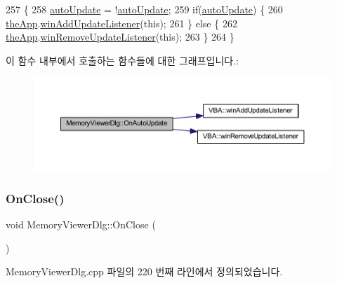 \begin{DoxyCode}
257 \{
258   \mbox{\hyperlink{class_memory_viewer_dlg_a3ec3d36d4676977f8f37f55ec7f7fb39}{autoUpdate}} = !\mbox{\hyperlink{class_memory_viewer_dlg_a3ec3d36d4676977f8f37f55ec7f7fb39}{autoUpdate}};
259   \textcolor{keywordflow}{if}(\mbox{\hyperlink{class_memory_viewer_dlg_a3ec3d36d4676977f8f37f55ec7f7fb39}{autoUpdate}}) \{
260     \mbox{\hyperlink{_v_b_a_8cpp_a8095a9d06b37a7efe3723f3218ad8fb3}{theApp}}.\mbox{\hyperlink{class_v_b_a_af0712f70a90d023ab8327a366be08174}{winAddUpdateListener}}(\textcolor{keyword}{this});
261   \} \textcolor{keywordflow}{else} \{
262     \mbox{\hyperlink{_v_b_a_8cpp_a8095a9d06b37a7efe3723f3218ad8fb3}{theApp}}.\mbox{\hyperlink{class_v_b_a_a2d31a0656df2230310aa8dc9e3a735d3}{winRemoveUpdateListener}}(\textcolor{keyword}{this});    
263   \}  
264 \}
\end{DoxyCode}
이 함수 내부에서 호출하는 함수들에 대한 그래프입니다.\+:
\nopagebreak
\begin{figure}[H]
\begin{center}
\leavevmode
\includegraphics[width=350pt]{class_memory_viewer_dlg_abd1a90d5974c83a3b388043d6162f118_cgraph}
\end{center}
\end{figure}
\mbox{\label{class_memory_viewer_dlg_a49522f159a0ccbca8c511e5c248b9b93}} 
\subsubsection{\texorpdfstring{On\+Close()}{OnClose()}}
{\footnotesize\ttfamily void Memory\+Viewer\+Dlg\+::\+On\+Close (\begin{DoxyParamCaption}{ }\end{DoxyParamCaption})\hspace{0.3cm}{\ttfamily [protected]}}



Memory\+Viewer\+Dlg.\+cpp 파일의 220 번째 라인에서 정의되었습니다.


